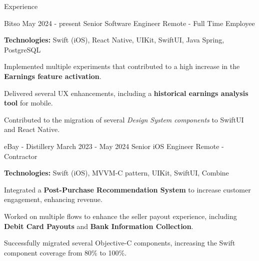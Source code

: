 \documentclass{curriculum}
\begin{document}

\begin{cvsection}{Experience}


    \makesectionitemheader
        {Bitso}                     {May 2024 - present}
        {Senior Software Engineer}  {Remote - Full Time Employee}

        \begin{sectionitemlist}
        \item{
                \textbf{Technologies:} Swift (iOS), React Native, UIKit, SwiftUI, Java Spring, PostgreSQL
            }
        \item{
            Implemented multiple experiments that contributed to a
            high increase in the \textbf{Earnings feature activation}.
        }
        \item{
            Delivered several UX enhancements, including a
            \textbf{historical earnings analysis tool} for mobile.
        }
        \item{
            Contributed to the migration of several
            \textit{Design System components} to SwiftUI and React Native.
        }
        \end{sectionitemlist}


    \makesectionitemheader
        {eBay - Distillery}         {March 2023 - May 2024}
        {Senior iOS Engineer}       {Remote - Contractor}

        \begin{sectionitemlist}
        \item{
            \textbf{Technologies:} Swift (iOS), MVVM-C pattern, UIKit, SwiftUI, Combine
        }
        \item{
            Integrated a \textbf{Post-Purchase Recommendation System} to increase customer engagement, enhancing revenue.
        }
        \item{
            Worked on multiple flows to enhance the seller payout experience,
            including \textbf{Debit Card Payouts} and \textbf{Bank Information Collection}.
        }
        \item{
            Successfully migrated several Objective-C components, increasing the Swift component coverage from 80\% to 100\%.
        }
        \end{sectionitemlist}


\end{cvsection}
\end{document}
